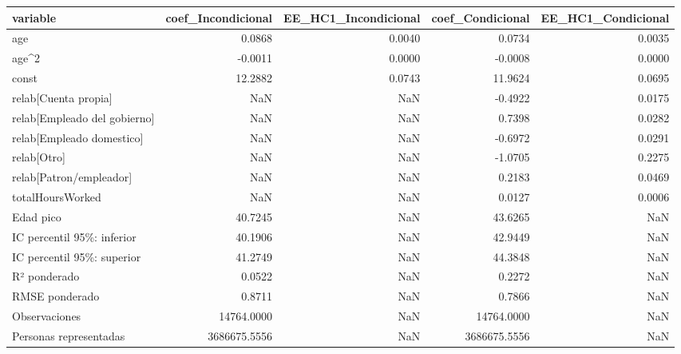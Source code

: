 \begin{tabular}{lrrrr}
\toprule
variable & coef\_Incondicional & EE\_HC1\_Incondicional & coef\_Condicional & EE\_HC1\_Condicional \\
\midrule
age & 0.0868 & 0.0040 & 0.0734 & 0.0035 \\
age\textasciicircum 2 & -0.0011 & 0.0000 & -0.0008 & 0.0000 \\
const & 12.2882 & 0.0743 & 11.9624 & 0.0695 \\
relab[Cuenta propia] & NaN & NaN & -0.4922 & 0.0175 \\
relab[Empleado del gobierno] & NaN & NaN & 0.7398 & 0.0282 \\
relab[Empleado domestico] & NaN & NaN & -0.6972 & 0.0291 \\
relab[Otro] & NaN & NaN & -1.0705 & 0.2275 \\
relab[Patron/empleador] & NaN & NaN & 0.2183 & 0.0469 \\
totalHoursWorked & NaN & NaN & 0.0127 & 0.0006 \\
Edad pico & 40.7245 & NaN & 43.6265 & NaN \\
IC percentil 95\%: inferior & 40.1906 & NaN & 42.9449 & NaN \\
IC percentil 95\%: superior & 41.2749 & NaN & 44.3848 & NaN \\
R² ponderado & 0.0522 & NaN & 0.2272 & NaN \\
RMSE ponderado & 0.8711 & NaN & 0.7866 & NaN \\
Observaciones & 14764.0000 & NaN & 14764.0000 & NaN \\
Personas representadas & 3686675.5556 & NaN & 3686675.5556 & NaN \\
\bottomrule
\end{tabular}
